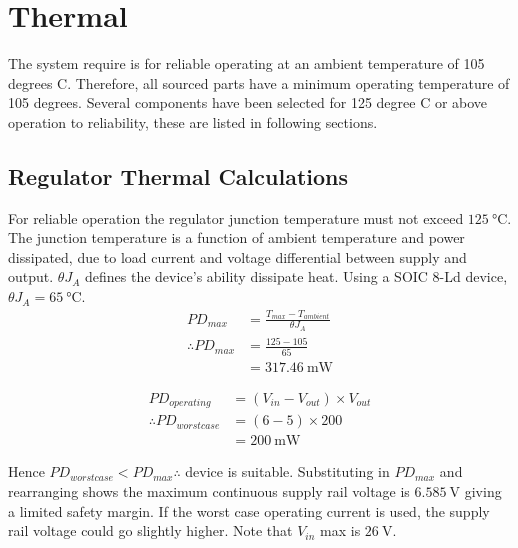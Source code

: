 \section{Thermal}
The system require is for reliable operating at an ambient temperature of 105 degrees C.
Therefore, all sourced parts have a minimum operating temperature of 105 degrees.
Several components have been selected for 125 degree C or above operation to reliability, these are listed in following sections.

\subsection{Regulator Thermal Calculations}
\label{ap:regulator}
For reliable operation the regulator junction temperature must not exceed $\SI{125}{\degreeCelsius}$. 
The junction temperature is a function of ambient temperature and power dissipated, due to load current and voltage differential between supply and output.
$\theta J_A$ defines the device's ability dissipate heat.
Using a SOIC 8-Ld device, $\theta J_A = \SI{65}{\degreeCelsius}$.
\begin{align}
	PD_{max} &= \frac{T_{max} - T_{ambient}}{\theta J_A} \\ 
	\therefore PD_{max} &= \frac{125-105}{ 65} \nonumber \\
		&= \SI{317.46}{\milli\watt} \nonumber
\end{align}

\begin{align}
	PD_{operating} &= (V_{in} - V_{out})\times V_{out} \\
	\therefore PD_{worst case} &= (6-5)\times 200 \nonumber \\
		&= \SI{200}{\milli\watt} \nonumber
\end{align}

Hence $PD_{worst case} < PD_{max} \therefore$ device is suitable.
Substituting in $PD_{max}$ and rearranging shows the maximum continuous supply rail voltage is $\SI{6.585}{\volt}$ giving a limited safety margin.
If the worst case operating current is used, the supply rail voltage could go slightly higher.
Note that $V_{in}$ max is $\SI{26}{\volt}$.

